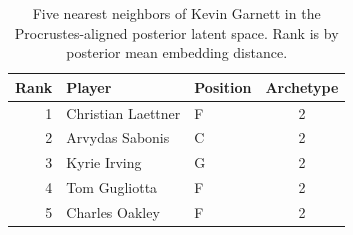 \begin{table}[htbp]
  \centering\small
  \begin{tabular}{rllc}
    \toprule
    Rank & Player & Position & Archetype \\
    \midrule
    1 & Christian Laettner & F & 2 \\
    2 & Arvydas Sabonis & C & 2 \\
    3 & Kyrie Irving & G & 2 \\
    4 & Tom Gugliotta & F & 2 \\
    5 & Charles Oakley & F & 2 \\
    \bottomrule
  \end{tabular}
  \caption{Five nearest neighbors of Kevin Garnett in the Procrustes-aligned posterior latent space. Rank is by posterior mean embedding distance.}
  \label{tab:Kevin_Garnett_neighbors}
\end{table}

